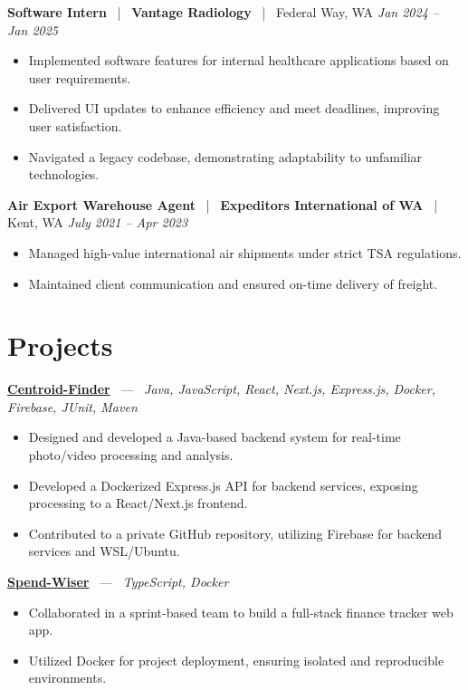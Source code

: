 \documentclass[10pt, letterpaper]{article}
\newcommand{\jobhead}[4]{%
  \vspace{5pt}%
  {\bfseries\color{dark}#1}%
  ~{\color{light}|}~%
  {\bfseries\color{navy}#2}%
  ~{\color{light}|}~%
  {\color{light}#3}%
  \hfill{\color{light}\small\textit{#4}}\\[-2pt]%
}
\newcommand{\projhead}[3]{%
  \vspace{5pt}%
  {\bfseries\color{dark}\href{#2}{#1}}%
  ~{\color{light}---}~%
  {\color{light}\small\textit{#3}}\\[-2pt]%
}
\begin{document}
\jobhead{Software Intern}{Vantage Radiology}{Federal Way, WA}{Jan 2024 – Jan 2025}
\begin{itemize}
  \item Implemented software features for internal healthcare applications based on user requirements.
  \item Delivered UI updates to enhance efficiency and meet deadlines, improving user satisfaction.
  \item Navigated a legacy codebase, demonstrating adaptability to unfamiliar technologies.
\end{itemize}

\jobhead{Air Export Warehouse Agent}{Expeditors International of WA}{Kent, WA}{July 2021 – Apr 2023}
\begin{itemize}
  \item Managed high-value international air shipments under strict TSA regulations.
  \item Maintained client communication and ensured on-time delivery of freight.
\end{itemize}

\section{Projects}

\projhead{Centroid-Finder}{https://github.com/xavierb117/centroid-finder}{Java, JavaScript, React, Next.js, Express.js, Docker, Firebase, JUnit, Maven}
\begin{itemize}
  \item Designed and developed a Java-based backend system for real-time photo/video processing and analysis.
  \item Developed a Dockerized Express.js API for backend services, exposing processing to a React/Next.js frontend.
  \item Contributed to a private GitHub repository, utilizing Firebase for backend services and WSL/Ubuntu.
\end{itemize}

\projhead{Spend-Wiser}{https://github.com/JesseChum/w26-sdev372-spendwiser-finance-tracker}{TypeScript, Docker}
\begin{itemize}
  \item Collaborated in a sprint-based team to build a full-stack finance tracker web app.
  \item Utilized Docker for project deployment, ensuring isolated and reproducible environments.
\end{itemize}
\end{document}
